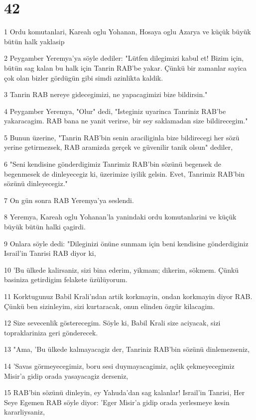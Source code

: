 \chapter{42}

\par 1 Ordu komutanlari, Kareah oglu Yohanan, Hosaya oglu Azarya ve küçük büyük bütün halk yaklasip
\par 2 Peygamber Yeremya'ya söyle dediler: "Lütfen dilegimizi kabul et! Bizim için, bütün sag kalan bu halk için Tanrin RAB'be yakar. Çünkü bir zamanlar sayica çok olan bizler gördügün gibi simdi azinlikta kaldik.
\par 3 Tanrin RAB nereye gidecegimizi, ne yapacagimizi bize bildirsin."
\par 4 Peygamber Yeremya, "Olur" dedi, "Isteginiz uyarinca Tanriniz RAB'be yakaracagim. RAB bana ne yanit verirse, bir sey saklamadan size bildirecegim."
\par 5 Bunun üzerine, "Tanrin RAB'bin senin araciliginla bize bildirecegi her sözü yerine getirmezsek, RAB aramizda gerçek ve güvenilir tanik olsun" dediler,
\par 6 "Seni kendisine gönderdigimiz Tanrimiz RAB'bin sözünü begensek de begenmesek de dinleyecegiz ki, üzerimize iyilik gelsin. Evet, Tanrimiz RAB'bin sözünü dinleyecegiz."
\par 7 On gün sonra RAB Yeremya'ya seslendi.
\par 8 Yeremya, Kareah oglu Yohanan'la yanindaki ordu komutanlarini ve küçük büyük bütün halki çagirdi.
\par 9 Onlara söyle dedi: "Dileginizi önüne sunmam için beni kendisine gönderdiginiz Israil'in Tanrisi RAB diyor ki,
\par 10 'Bu ülkede kalirsaniz, sizi bina ederim, yikmam; dikerim, sökmem. Çünkü basiniza getirdigim felakete üzülüyorum.
\par 11 Korktugunuz Babil Krali'ndan artik korkmayin, ondan korkmayin diyor RAB. Çünkü ben sizinleyim, sizi kurtaracak, onun elinden özgür kilacagim.
\par 12 Size sevecenlik gösterecegim. Söyle ki, Babil Krali size aciyacak, sizi topraklariniza geri gönderecek.
\par 13 "Ama, 'Bu ülkede kalmayacagiz der, Tanriniz RAB'bin sözünü dinlemezseniz,
\par 14 'Savas görmeyecegimiz, boru sesi duymayacagimiz, açlik çekmeyecegimiz Misir'a gidip orada yasayacagiz derseniz,
\par 15 RAB'bin sözünü dinleyin, ey Yahuda'dan sag kalanlar! Israil'in Tanrisi, Her Seye Egemen RAB söyle diyor: 'Eger Misir'a gidip orada yerlesmeye kesin kararliysaniz,
